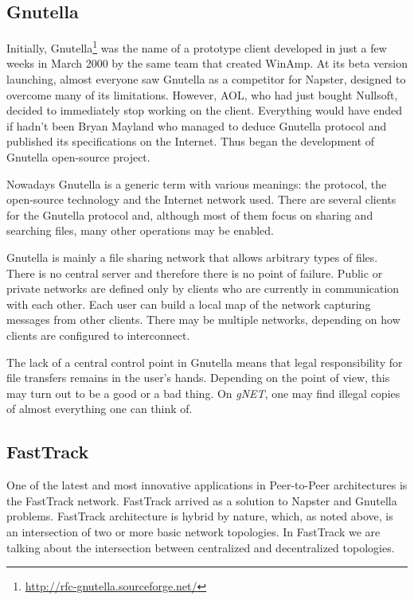\subsection{Gnutella}

Initially, Gnutella\footnote{\url{http://rfc-gnutella.sourceforge.net/}} was the name of a prototype client developed in just a few
weeks in March 2000 by the same team that created WinAmp. At its beta version
launching, almost everyone saw Gnutella as a competitor for Napster, designed
to overcome many of its limitations. However, AOL, who had just bought
Nullsoft, decided to immediately stop working on the client. Everything would
have ended if hadn't been Bryan Mayland who managed to deduce Gnutella
protocol and published its specifications on the Internet. Thus began the
development of Gnutella open-source project.

Nowadays Gnutella is a generic term with various meanings: the protocol, the
open-source technology and the Internet network used. There are several
clients for the Gnutella protocol and, although most of them focus on sharing
and searching files, many other operations may be enabled.

Gnutella is mainly a file sharing network that allows arbitrary types of
files. There is no central server and therefore there is no point of failure.
Public or private networks are defined only by clients who are currently in
communication with each other. Each user can build a local map of the network
capturing messages from other clients. There may be multiple networks,
depending on how clients are configured to interconnect.

The lack of a central control point in Gnutella means that legal
responsibility for file transfers remains in the user's hands. Depending on
the point of view, this may turn out to be a good or a bad thing. On
\textit{gNET}, one may find illegal copies of almost everything one can think
of.

\subsection{FastTrack}

One of the latest and most innovative  applications in Peer-to-Peer
architectures is the FastTrack network. FastTrack arrived as a solution to
Napster and Gnutella problems. FastTrack architecture is hybrid by nature,
which, as noted above, is an intersection of two or more basic network
topologies. In FastTrack we are talking about the intersection between
centralized and decentralized topologies.

